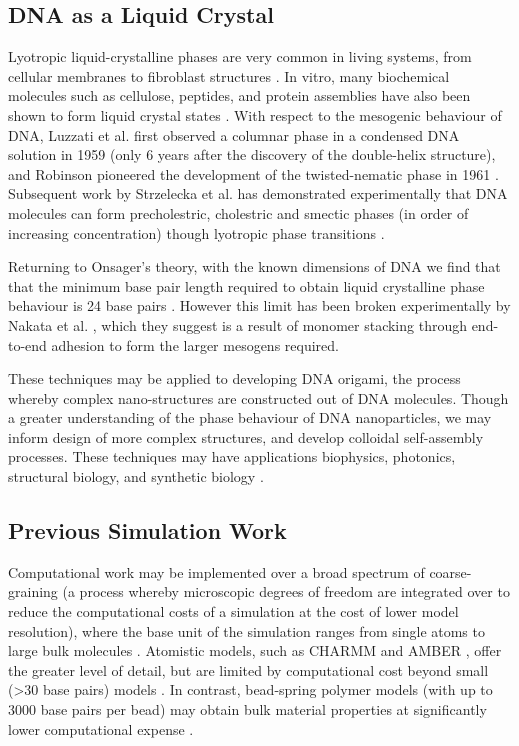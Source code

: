 \documentclass[11pt, a4paper]{article} %
\begin{document}
\subsection{DNA as a Liquid Crystal} 
Lyotropic liquid-crystalline phases are very common in living systems, from cellular membranes to fibroblast structures \cite{Stewart1966, Rey2013}. In vitro, many biochemical molecules such as cellulose, peptides, and protein assemblies have also been shown to form liquid crystal states \cite{Zhao2019}. With respect to the mesogenic behaviour of DNA, Luzzati et al. first observed a columnar phase in a condensed DNA solution in 1959 (only 6 years after the discovery of the double-helix structure), and Robinson pioneered the development of the twisted-nematic phase in 1961 \cite{Luzzati1959, Robinson1961}. Subsequent work by Strzelecka et al. has demonstrated experimentally that DNA molecules can form precholestric, cholestric and smectic phases (in order of increasing concentration) though lyotropic phase transitions \cite{Strzelecka1988}. 

Returning to Onsager's theory, with the known dimensions of DNA we find that that the minimum base pair length required to obtain liquid crystalline phase behaviour is 24 base pairs \cite{Bolhuis1997}. However this limit has been broken experimentally by Nakata et al. \cite{Nakata2007, Zanchetta2008}, which they suggest is a result of monomer stacking through end-to-end adhesion to form the larger mesogens required.

These techniques may be applied to developing DNA origami, the process whereby complex nano-structures are constructed out of DNA molecules. Though a greater understanding of the phase behaviour of DNA nanoparticles, we may inform design of more complex structures, and develop colloidal self-assembly processes. These techniques may have applications biophysics, photonics, structural biology, and synthetic biology \cite{Nummelin2018, Praetorius2017, Bathe2017}.


\subsection{Previous Simulation Work} \label{sec:PrevWork}
Computational work may be implemented over a broad spectrum of coarse-graining (a process whereby microscopic degrees of freedom are integrated over to reduce the computational costs of a simulation at the cost of lower model resolution), where the base unit of the simulation ranges from single atoms to large bulk molecules \cite{Inglfsson2013, Potoyan2012}. Atomistic models, such as CHARMM \cite{MacKerell1995} and AMBER \cite{SalomonFerrer2012}, offer the greater level of detail, but are limited by computational cost beyond small (>30 base pairs) models \cite{Cheatham2004}. In contrast, bead-spring polymer models (with up to 3000 base pairs per bead) may obtain bulk material properties at significantly lower computational expense \cite{Michieletto2016}.
\end{document}
